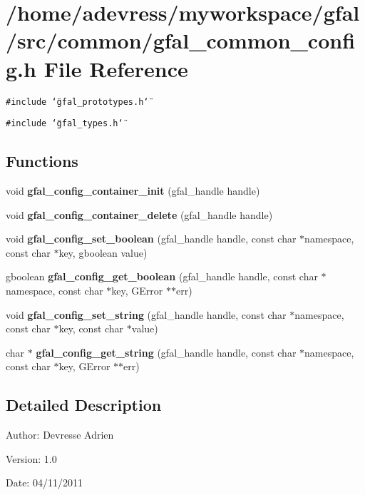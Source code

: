 \section{/home/adevress/myworkspace/gfal/src/common/gfal\_\-common\_\-config.h File Reference}
\label{gfal__common__config_8h}
{\tt \#include \char`\"{}gfal\_\-prototypes.h\char`\"{}}\par
{\tt \#include \char`\"{}gfal\_\-types.h\char`\"{}}\par
\subsection*{Functions}
\begin{CompactItemize}
\item 
void \textbf{gfal\_\-config\_\-container\_\-init} (gfal\_\-handle handle)\label{gfal__common__config_8h_f4d0feecfb7d37db0c9e43fda98cf30b}

\item 
void \textbf{gfal\_\-config\_\-container\_\-delete} (gfal\_\-handle handle)\label{gfal__common__config_8h_4a50cdc068fe4366702ccb19dcbf7646}

\item 
void \textbf{gfal\_\-config\_\-set\_\-boolean} (gfal\_\-handle handle, const char $\ast$namespace, const char $\ast$key, gboolean value)\label{gfal__common__config_8h_95f648ce0b3e7da48163b072bcf80c68}

\item 
gboolean \textbf{gfal\_\-config\_\-get\_\-boolean} (gfal\_\-handle handle, const char $\ast$namespace, const char $\ast$key, GError $\ast$$\ast$err)\label{gfal__common__config_8h_d3b76d548cef5dad5897f2b2d3a8686b}

\item 
void \textbf{gfal\_\-config\_\-set\_\-string} (gfal\_\-handle handle, const char $\ast$namespace, const char $\ast$key, const char $\ast$value)\label{gfal__common__config_8h_1a9b755fbc1750e5bc13abeab0842795}

\item 
char $\ast$ \textbf{gfal\_\-config\_\-get\_\-string} (gfal\_\-handle handle, const char $\ast$namespace, const char $\ast$key, GError $\ast$$\ast$err)\label{gfal__common__config_8h_98bac19426ed2686fa2ba17fce1f2d77}

\end{CompactItemize}


\subsection{Detailed Description}
\begin{Desc}
\item[Author:]Devresse Adrien \end{Desc}
\begin{Desc}
\item[Version:]1.0 \end{Desc}
\begin{Desc}
\item[Date:]04/11/2011 \end{Desc}
